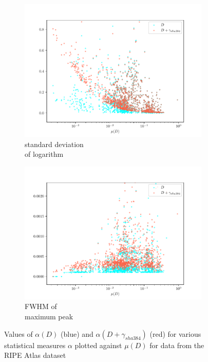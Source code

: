 \documentclass[12pt,a4paper,automark, toc=bib]{scrreprt}
\theoremstyle{definition}
\begin{document}
\begin{figure}
\begin{subfigure}{0.32\linewidth}
				\includegraphics[width=\linewidth]{figures/stat_sha384_0log_std.pdf}
				\caption{standard deviation \\of logarithm}
			\end{subfigure}
			\begin{subfigure}{0.32\linewidth}
				\includegraphics[width=\linewidth]{figures/stat_sha384_0FWHM.pdf}
				\caption{FWHM of\\maximum peak}
			\end{subfigure}
		\begin{subfigure}{0.32\linewidth}
			\hphantom{a}
		\end{subfigure}
			\caption{Values of $\alpha(D)$ (blue) and $\alpha(D + \gamma_{sha384})$ (red) for various statistical measures $\alpha$ plotted against $\mu(D)$ for data from the RIPE Atlas dataset}
			\label{stat-mes-fig-2}
		\end{figure}%
\end{document}
